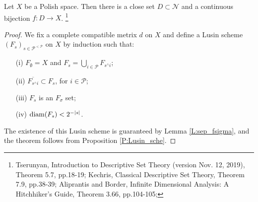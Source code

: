 \begin{theorem} \label{T:pol_bij}
Let $X$ be a Polish space. Then there is a close set $D\subset \mathcal{N}$ and a
continuous bijection $f: D\to X$.
\footnote{
  Tserunyan, Introduction to Descriptive Set Theory (version Nov. 12, 2019), 
  Theorem 5.7, pp.18-19;
  Kechris, Classical Descriptive Set Theory, Theorem 7.9, pp.38-39;
  Aliprantis and Border, Infinite Dimensional Analysis: A 
  Hitchhiker's Guide, Theorem 3.66, pp.104-105;
}
\end{theorem}
\begin{proof}
We fix a complete compatible metrix $d$ on $X$ and define a Lusin scheme 
$(F_s)_{s\in \mathcal{P}^{<\mathcal{P}}}$ on $X$ by induction such that:
\begin{enumerate}
   \item[(i)] $F_{\emptyset}=X$ and 
              $F_s=\bigcup_{i\in\mathcal{P}} F_{s^\wedge i}$;
   \item[(ii)] $\overline{F_{s^\wedge i}}\subset F_s$, for $i\in\mathcal{P}$;
   \item[(iii)] $F_s$ is an $F_{\sigma}$ set;
   \item[(iv)] $\operatorname*{diam}(F_s)<2^{-|s|}$.
\end{enumerate}
The existence of this Lusin scheme is guaranteed by Lemma \ref{L:sep_fsigma},
and the theorem follows from Proposition \ref{P:Lusin_sche}.

\end{proof}









